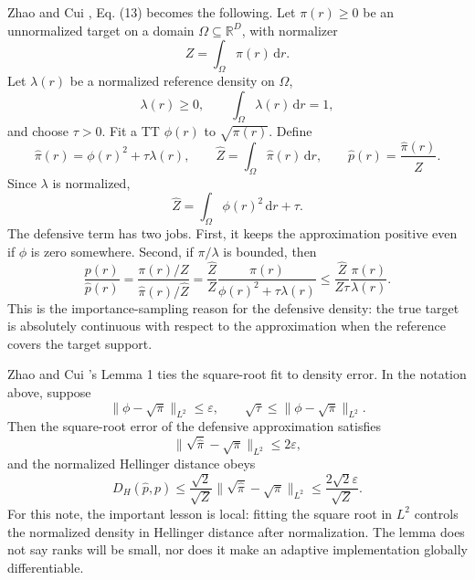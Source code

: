 \documentclass[11pt]{article}
\numberwithin{equation}{section}
\newcommand{\R}{\mathbb R}
\newcommand{\dd}{\,\mathrm d}
\begin{document}
Zhao and Cui \cite{zhao2024ttsequential}, Eq. (13) becomes the following.  Let \(\pi(r)\ge0\) be an
unnormalized target on a domain \(\Omega\subseteq\R^D\), with normalizer
\[
    Z=\int_\Omega \pi(r)\dd r.
\]
Let \(\lambda(r)\) be a normalized reference density on \(\Omega\),
\[
    \lambda(r)\ge0,\qquad \int_\Omega \lambda(r)\dd r=1,
\]
and choose \(\tau>0\).  Fit a TT \(\phi(r)\) to \(\sqrt{\pi(r)}\).  Define
\begin{equation}
    \widehat\pi(r)
    =
    \phi(r)^2+\tau\lambda(r),
    \qquad
    \widehat Z
    =
    \int_\Omega \widehat\pi(r)\dd r,
    \qquad
    \widehat p(r)
    =
    \frac{\widehat\pi(r)}{\widehat Z}.
    \label{eq:p24-s1}
\end{equation}
Since \(\lambda\) is normalized,
\begin{equation}
    \widehat Z
    =
    \int_\Omega \phi(r)^2\dd r+\tau.
    \label{eq:p24-s2}
\end{equation}
The defensive term has two jobs.  First, it keeps the approximation positive
even if \(\phi\) is zero somewhere.  Second, if \(\pi/\lambda\) is bounded, then
\begin{equation}
    \frac{p(r)}{\widehat p(r)}
    =
    \frac{\pi(r)/Z}{\widehat\pi(r)/\widehat Z}
    =
    \frac{\widehat Z}{Z}
    \frac{\pi(r)}{\phi(r)^2+\tau\lambda(r)}
    \le
    \frac{\widehat Z}{Z\tau}
    \frac{\pi(r)}{\lambda(r)}.
    \label{eq:p24-s3}
\end{equation}
This is the importance-sampling reason for the defensive density: the true
target is absolutely continuous with respect to the approximation when the
reference covers the target support.

Zhao and Cui \cite{zhao2024ttsequential}'s Lemma 1 ties the square-root fit to density error.  In the notation
above, suppose
\begin{equation}
    \|\phi-\sqrt{\pi}\|_{L^2}\le \varepsilon,
    \qquad
    \sqrt{\tau}\le \|\phi-\sqrt{\pi}\|_{L^2}.
    \label{eq:p24-s4}
\end{equation}
Then the square-root error of the defensive approximation satisfies
\begin{equation}
    \|\sqrt{\widehat\pi}-\sqrt{\pi}\|_{L^2}\le 2\varepsilon,
    \label{eq:p24-s5}
\end{equation}
and the normalized Hellinger distance obeys
\begin{equation}
    D_H(\widehat p,p)
    \le
    \frac{\sqrt{2}}{\sqrt Z}
    \|\sqrt{\widehat\pi}-\sqrt{\pi}\|_{L^2}
    \le
    \frac{2\sqrt{2}\varepsilon}{\sqrt Z}.
    \label{eq:p24-s6}
\end{equation}
For this note, the important lesson is local: fitting the square root in
\(L^2\) controls the normalized density in Hellinger distance after
normalization.  The lemma does not say ranks will be small, nor does it make an
adaptive implementation globally differentiable.
\end{document}

